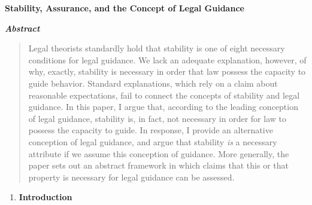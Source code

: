 \textbf{Stability, Assurance, and the Concept of Legal Guidance}

\emph{\textbf{Abstract}}

\begin{quote}
Legal theorists standardly hold that stability is one of eight necessary
conditions for legal guidance. We lack an adequate explanation, however,
of why, exactly, stability is necessary in order that law possess the
capacity to guide behavior. Standard explanations, which rely on a claim
about reasonable expectations, fail to connect the concepts of stability
and legal guidance. In this paper, I argue that, according to the
leading conception of legal guidance, stability is, in fact, not
necessary in order for law to possess the capacity to guide. In
response, I provide an alternative conception of legal guidance, and
argue that stability \emph{is} a necessary attribute if we assume this
conception of guidance. More generally, the paper sets out an abstract
framework in which claims that this or that property is necessary for
legal guidance can be assessed.
\end{quote}

\begin{enumerate}
\def\labelenumi{\arabic{enumi}.}
\item
  \textbf{Introduction}
\end{enumerate}

